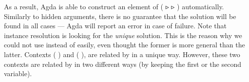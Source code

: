 
As a result, Agda is able to construct an element of
  (   ▹  ▹ ) automatically.
Similarly
to hidden arguments, there is no guarantee that the solution will be found
in all cases --- Agda will report an error in case of failure.
Note that instance resolution is looking for the \emph{unique} solution.
This is the reason why we could not use  instead of  easily,
even thought the former is more general than the latter.
Contexts (  ) and (    ),
are related by  in a unique way.  However, these two contexts are
related by  in two different ways (by keeping the first or the
second variable).

